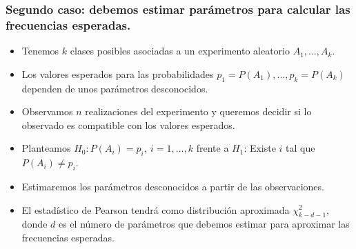 \subsubsection*{Segundo caso: debemos estimar parámetros para calcular las frecuencias esperadas.}
\begin{tcolorbox}[colback=blue!5!white, colframe=blue!75!black, title=\textbf{Segundo ejemplo, un caso común:}]
\begin{itemize}[label=\textbullet]
    \item Tenemos $k$ clases posibles asociadas a un experimento aleatorio $A_1,\dots,A_k$.
    \item Los valores esperados para las probabilidades $p_1=P(A_1),\dots,p_k=P(A_k)$ dependen de unos parámetros desconocidos.
    \item Observamos $n$ realizaciones del experimento y queremos decidir si lo observado es compatible con los valores esperados.
    \item Planteamos $H_0:P(A_i)=p_i,\: i=1,\dots,k$ frente a $H_1$: Existe $i$ tal que $P(A_i)\neq p_i$.
\end{itemize}
\end{tcolorbox}
\begin{tcolorbox}[colback=olive!5!white, colframe=olive!75!black, title=\textbf{Procederemos igual que antes, pero:}]
\begin{itemize}[label=\textbullet]
    \item Estimaremos los parámetros desconocidos a partir de las observaciones.
    \item El estadístico de Pearson tendrá como distribución aproximada $\chi_{k-d-1}^2$, donde $d$ es el número de parámetros que debemos estimar para aproximar las frecuencias esperadas.
\end{itemize}
\end{tcolorbox}
